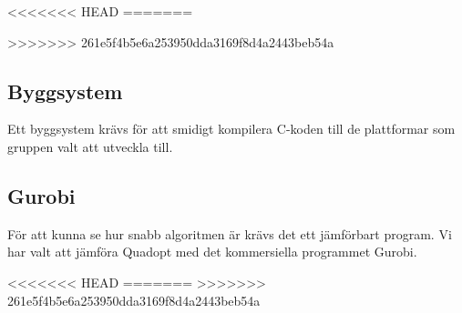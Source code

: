 \begin{LIPSaktivitetslista}
<<<<<<< HEAD
=======
	
>>>>>>> 261e5f4b5e6a253950dda3169f8d4a2443beb54a
\end{LIPSaktivitetslista}

\subsection{Byggsystem}
Ett byggsystem krävs för att smidigt kompilera C-koden till de plattformar som gruppen valt att utveckla till.
\begin{LIPSaktivitetslista}
\end{LIPSaktivitetslista}

\subsection{Gurobi}
För att kunna se hur snabb algoritmen är krävs det ett jämförbart program. Vi har valt att jämföra Quadopt med det kommersiella programmet Gurobi.
\begin{LIPSaktivitetslista}
<<<<<<< HEAD
=======
>>>>>>> 261e5f4b5e6a253950dda3169f8d4a2443beb54a
\end{LIPSaktivitetslista}
